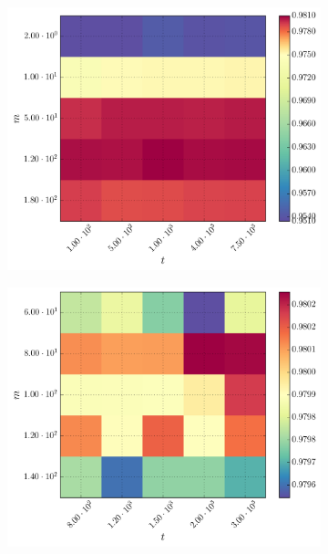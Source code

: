 \begin{figure}[h]
	\centering
	\begin{subfigure}[t]{0.49\textwidth}
		\centering
		\includegraphics[width=\textwidth]{figures/gridsearch/rf/superclasses/rf-superclasses-01.png}
	\end{subfigure}
	\begin{subfigure}[t]{0.49\textwidth}
		\centering
		\includegraphics[width=\textwidth]{figures/gridsearch/rf/superclasses/rf-superclasses-02.png}
	\end{subfigure}
\end{figure}
